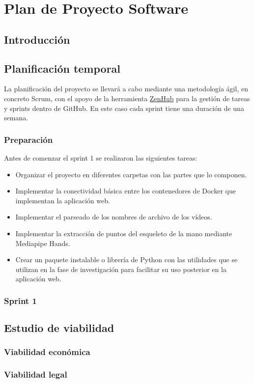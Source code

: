 \chapter{Plan de Proyecto Software}
\label{cha:Plan de Proyecto Software}

\section{Introducción}

\section{Planificación temporal}

La planificación del proyecto se llevará a cabo mediante una metodología ágil,
en concreto Scrum, con el apoyo de la herramienta
\href{https://www.zenhub.com/}{ZenHub} para la gestión de tareas y sprints
dentro de GitHub. En este caso cada sprint tiene una duración de una semana.

\subsection{Preparación}

Antes de comenzar el sprint 1 se realizaron las siguientes tareas:

\begin{itemize}
    \item Organizar el proyecto en diferentes carpetas con las partes que
          lo componen.
    \item Implementar la conectividad básica entre los contenedores de Docker
          que implementan la aplicación web.
    \item Implementar el parseado de los nombres de archivo de los vídeos.
    \item Implementar la extracción de puntos del esqueleto de la mano mediante
          Mediapipe Hands.
    \item Crear un paquete instalable o librería de Python con las utilidades
          que se utilizan en la fase de investigación para facilitar su uso
          posterior en la aplicación web.
\end{itemize}

\subsection{Sprint 1}

\section{Estudio de viabilidad}

\subsection{Viabilidad económica}

\subsection{Viabilidad legal}
